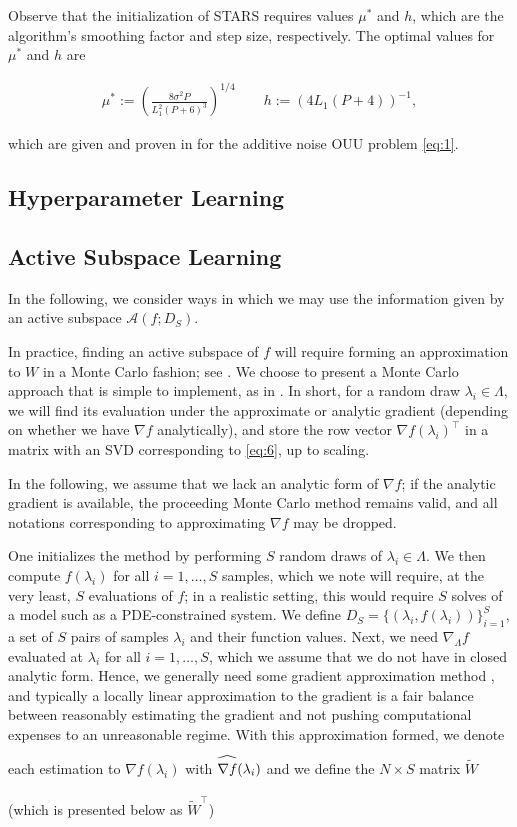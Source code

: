 \documentclass{amsart}
\newcommand{\A}{\mathcal{A}}
\newcommand\reallywidehat[1]{\arraycolsep=0pt\relax%
\begin{array}{c}
\stretchto{
  \scaleto{
    \scalerel*[\widthof{\ensuremath{#1}}]{\kern-.5pt\bigwedge\kern-.5pt}
    {\rule[-\textheight/2]{1ex}{\textheight}} %
  }{\textheight} %
}{0.5ex}\\           %
#1\\                 %
\rule{-1ex}{0ex}
\end{array}
}
\begin{document}
\vspace{.25cm}

\noindent Observe that the initialization of STARS requires values $\mu^*$ and $h$, which are the algorithm's smoothing factor and step size, respectively. The optimal values for $\mu^*$ and $h$ are 

\begin{eqnarray} \label{eq:8}
\mu^*:=\left( \frac{8\sigma^2 P}{L_1^2(P+6)^3}\right)^{1/4} \quad \quad h:=(4L_1(P+4))^{-1},
\end{eqnarray} 

which are given and proven in \cite{CW} for the additive noise OUU problem \eqref{eq:1}. 


\subsection{Hyperparameter Learning}


\subsection{Active Subspace Learning}

In the following, we consider ways in which we may use the information given by an active subspace $\A(f;D_S)$.

In practice, finding an active subspace of $f$ will require forming an approximation to $W$ in a Monte Carlo fashion; see \cite{ConstantineMC}. We choose to present a Monte Carlo approach that is simple to implement, as in \cite{Russi}. In short, for a random draw $\lambda_i \in \Lambda$, we will find its evaluation under the approximate or analytic gradient (depending on whether we have $\nabla f$ analytically), and store the row vector $\nabla f(\lambda_i)^\top$ in a matrix with an SVD corresponding to \eqref{eq:6}, up to scaling.

In the following, we assume that we lack an analytic form of $\nabla f$; if the analytic gradient is available, the proceeding Monte Carlo method remains valid, and all notations corresponding to approximating $\nabla f$ may be dropped.


One initializes the method by performing $S$ random draws of $\lambda_i \in \Lambda$. We then compute $f(\lambda_i)$ for all $i=1,\ldots,S$ samples, which we note will require, at the very least, $S$ evaluations of $f$; in a realistic setting, this would require $S$ solves of a model such as a PDE-constrained system. We define $D_S=\{(\lambda_i,f(\lambda_i))\}_{i=1}^S$, a set of $S$ pairs of samples $\lambda_i$ and their function values. Next, we need $\nabla_\Lambda f$ evaluated at $\lambda_i$ for all $i=1,\ldots,S$, which we assume that we do not have in closed analytic form. Hence, we generally need some gradient approximation method \cite{Smith}, and typically a locally linear approximation to the gradient is a fair balance between reasonably estimating the gradient and not pushing computational expenses to an unreasonable regime. With this approximation formed, we denote each estimation to $\nabla f(\lambda_i)$ with $\reallywidehat{\nabla f}(\lambda_i)$ and we define the $N \times S$ matrix $\tilde{W}$ (which is presented below as $\tilde{W}^\top$)
\end{document}
